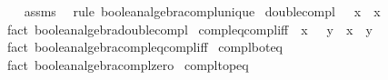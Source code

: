 \begin{isabellebody}
%
\isadelimproof
\ \ %
\endisadelimproof
%
\isatagproof
{}\isamarkupfalse%
\ assms\ \isamarkupfalse%
\ {\isacharparenleft}{\kern0pt}rule\ boolean{\isacharunderscore}{\kern0pt}algebra{\isachardot}{\kern0pt}compl{\isacharunderscore}{\kern0pt}unique{\isacharparenright}{\kern0pt}%
\endisatagproof
{\isafoldproof}%
%
\isadelimproof
\isanewline
%
\endisadelimproof
\isanewline
{}\isamarkupfalse%
\ double{\isacharunderscore}{\kern0pt}compl{\isacharcolon}{\kern0pt}\ {\isachardoublequoteopen}{\isacharminus}{\kern0pt}\ {\isacharparenleft}{\kern0pt}{\isacharminus}{\kern0pt}\ x{\isacharparenright}{\kern0pt}\ {\isacharequal}{\kern0pt}\ x{\isachardoublequoteclose}\isanewline
%
\isadelimproof
\ \ %
\endisadelimproof
%
\isatagproof
{}\isamarkupfalse%
\ {\isacharparenleft}{\kern0pt}fact\ boolean{\isacharunderscore}{\kern0pt}algebra{\isachardot}{\kern0pt}double{\isacharunderscore}{\kern0pt}compl{\isacharparenright}{\kern0pt}%
\endisatagproof
{\isafoldproof}%
%
\isadelimproof
\isanewline
%
\endisadelimproof
\isanewline
{}\isamarkupfalse%
\ compl{\isacharunderscore}{\kern0pt}eq{\isacharunderscore}{\kern0pt}compl{\isacharunderscore}{\kern0pt}iff{\isacharcolon}{\kern0pt}\ {\isachardoublequoteopen}{\isacharminus}{\kern0pt}\ x\ {\isacharequal}{\kern0pt}\ {\isacharminus}{\kern0pt}\ y\ {\isasymlongleftrightarrow}\ x\ {\isacharequal}{\kern0pt}\ y{\isachardoublequoteclose}\isanewline
%
\isadelimproof
\ \ %
\endisadelimproof
%
\isatagproof
{}\isamarkupfalse%
\ {\isacharparenleft}{\kern0pt}fact\ boolean{\isacharunderscore}{\kern0pt}algebra{\isachardot}{\kern0pt}compl{\isacharunderscore}{\kern0pt}eq{\isacharunderscore}{\kern0pt}compl{\isacharunderscore}{\kern0pt}iff{\isacharparenright}{\kern0pt}%
\endisatagproof
{\isafoldproof}%
%
\isadelimproof
\isanewline
%
\endisadelimproof
\isanewline
{}\isamarkupfalse%
\ compl{\isacharunderscore}{\kern0pt}bot{\isacharunderscore}{\kern0pt}eq{\isacharcolon}{\kern0pt}\ {\isachardoublequoteopen}{\isacharminus}{\kern0pt}\ {\isasymbottom}\ {\isacharequal}{\kern0pt}\ {\isasymtop}{\isachardoublequoteclose}\isanewline
%
\isadelimproof
\ \ %
\endisadelimproof
%
\isatagproof
{}\isamarkupfalse%
\ {\isacharparenleft}{\kern0pt}fact\ boolean{\isacharunderscore}{\kern0pt}algebra{\isachardot}{\kern0pt}compl{\isacharunderscore}{\kern0pt}zero{\isacharparenright}{\kern0pt}%
\endisatagproof
{\isafoldproof}%
%
\isadelimproof
\isanewline
%
\endisadelimproof
\isanewline
{}\isamarkupfalse%
\ compl{\isacharunderscore}{\kern0pt}top{\isacharunderscore}{\kern0pt}eq{\isacharcolon}{\kern0pt}\ {\isachardoublequoteopen}{\isacharminus}{\kern0pt}\ {\isasymtop}\ {\isacharequal}{\kern0pt}\ {\isasymbottom}{\isachardoublequoteclose}\isanewline

\end{isabellebody}
